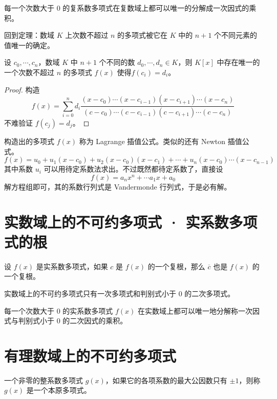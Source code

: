 \begin{theorem}
	每一个次数大于 $0$ 的复系数多项式在复数域上都可以唯一的分解成一次因式的乘积。
\end{theorem}

回到定理：数域 $K$ 上次数不超过 $n$ 的多项式被它在 $K$ 中的 $n+1$ 个不同元素的值唯一的确定。

\begin{theorem}
	设 $c_0,\cdots,c_n$，数域 $K$ 中 $n+1$ 个不同的数 $d_0,\cdots,d_n \in K$，则 $K[x]$ 中存在唯一的一个次数不超过 $n$ 的多项式 $f(x)$ 使得$f(c_i) = d_i$。
\end{theorem}
\begin{proof}
	构造
	\[ f(x) = \sum_{i=0}^n d_i \frac{(x-c_0)\cdots(x-c_{i-1})(x-c_{i+1})\cdots(x-c_n)}{(c-c_0)\cdots(c-c_{i-1})(c-c_{i+1})\cdots(c-c_n)} \]
	不难验证 $f(c_j) = d_j$。
\end{proof}

构造出的多项式 $f(x)$ 称为 Lagrange 插值公式。类似的还有 Newton 插值公式。
\[ f(x) = u_0 + u_1(x-c_0) + u_2(x-c_0)(x-c_1) + \cdots + u_n(x-c_0)\cdots(x-c_{n-1}) \]
其中系数 $u_i$ 可以用待定系数法求出。不过既然都待定系数了，直接设
\[ f(x) = a_nx^n + \cdots a_1x + a_0 \]
解方程组即可，其的系数行列式是 Vandermonde 行列式，于是必有解。

\section{实数域上的不可约多项式 · 实系数多项式的根}

\begin{theorem}
	设 $f(x)$ 是实系数多项式，如果 $c$ 是 $f(x)$ 的一个复根，那么 $\overline{c}$ 也是 $f(x)$ 的一个复根。
\end{theorem}

\begin{theorem}
	实数域上的不可约多项式只有一次多项式和判别式小于 $0$ 的二次多项式。
\end{theorem}

\begin{theorem}
	每一个次数大于 $0$ 的实系数多项式 $f(x)$ 在实数域上都可以唯一地分解称一次因式与判别式小于 $0$ 的二次因式的乘积。
\end{theorem}

\section{有理数域上的不可约多项式}

\begin{definition}
	一个非零的整系数多项式 $g(x)$，如果它的各项系数的最大公因数只有 $\pm 1$，则称 $g(x)$ 是一个本原多项式。
\end{definition}

